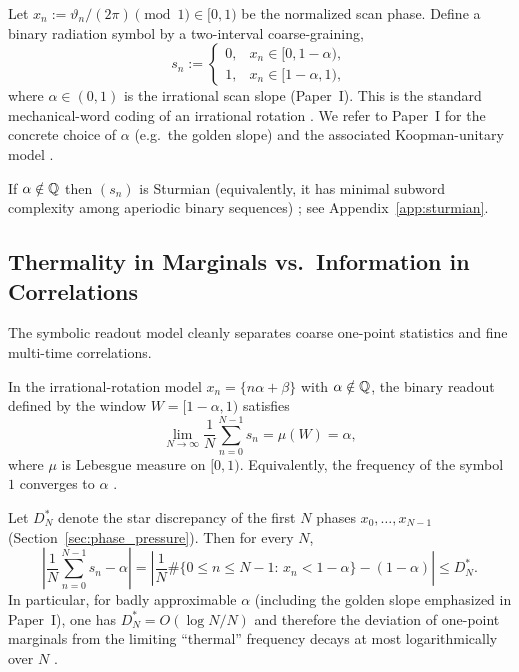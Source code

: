 \begin{definition}
Let $x_n:=\vartheta_n/(2\pi)\pmod{1}\in[0,1)$ be the normalized scan phase. Define a binary radiation symbol by a two-interval coarse-graining,
\begin{equation}
  s_n :=
  \begin{cases}
    0,& x_n\in[0,1-\alpha),\\
    1,& x_n\in[1-\alpha,1),
  \end{cases}
\end{equation}
where $\alpha\in(0,1)$ is the irrational scan slope (Paper~I). This is the standard mechanical-word coding of an irrational rotation \cite{Lothaire2002, LindMarcus1995}.
We refer to Paper~I for the concrete choice of $\alpha$ (e.g.\ the golden slope) and the associated Koopman-unitary model \cite{Ma2025HPA}.
\end{definition}

\begin{proposition}
If $\alpha\notin\mathbb{Q}$ then $(s_n)$ is Sturmian (equivalently, it has minimal subword complexity among aperiodic binary sequences) \cite{MorseHedlund1940, Lothaire2002}; see Appendix~\ref{app:sturmian}.
\end{proposition}

\subsection{Thermality in Marginals vs.\ Information in Correlations}
The symbolic readout model cleanly separates coarse one-point statistics and fine multi-time correlations.

\begin{proposition}
In the irrational-rotation model $x_n=\{n\alpha+\beta\}$ with $\alpha\notin\mathbb{Q}$, the binary readout defined by the window $W=[1-\alpha,1)$ satisfies
\begin{equation}
  \lim_{N\to\infty}\frac{1}{N}\sum_{n=0}^{N-1} s_n
  =\mu(W)
  =\alpha,
\end{equation}
where $\mu$ is Lebesgue measure on $[0,1)$. Equivalently, the frequency of the symbol $1$ converges to $\alpha$ \cite{Weyl1916}.
\end{proposition}

\begin{corollary}
Let $D_N^*$ denote the star discrepancy of the first $N$ phases $x_0,\dots,x_{N-1}$ (Section~\ref{sec:phase_pressure}). Then for every $N$,
\begin{equation}
  \left|\frac{1}{N}\sum_{n=0}^{N-1}s_n-\alpha\right|
  =
  \left|\frac{1}{N}\#\{0\le n\le N-1:\,x_n<1-\alpha\}-(1-\alpha)\right|
  \le D_N^*.
\end{equation}
In particular, for badly approximable $\alpha$ (including the golden slope emphasized in Paper~I), one has $D_N^*=O(\log N/N)$ and therefore the deviation of one-point marginals from the limiting ``thermal'' frequency decays at most logarithmically over $N$ \cite{Denjoy1932,Koksma1935,KuipersNiederreiter1974}.
\end{corollary}

